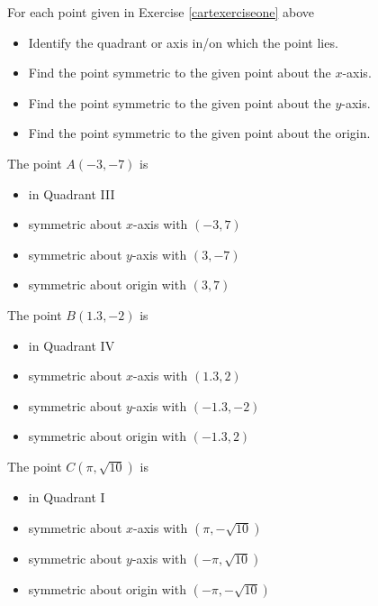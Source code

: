 {For each point given in Exercise \ref{cartexerciseone} above

\begin{itemize}

\item Identify the quadrant or axis in/on which the point lies.
\item Find the point symmetric to the given point about the $x$-axis.
\item Find the point symmetric to the given point about the $y$-axis.
\item Find the point symmetric to the given point about the origin.

\end{itemize}}
{The point $A(-3, -7)$ is 

\begin{itemize}

\item in Quadrant III
\item symmetric about $x$-axis with $(-3, 7)$
\item symmetric about $y$-axis with $(3, -7)$
\item symmetric about origin with $(3, 7)$

\end{itemize}

The point $B(1.3, -2)$ is 

\begin{itemize}

\item in Quadrant IV
\item symmetric about $x$-axis with $(1.3, 2)$
\item symmetric about $y$-axis with $(-1.3, -2)$
\item symmetric about origin with $(-1.3, 2)$

\end{itemize}

The point $C(\pi, \sqrt{10})$ is 

\begin{itemize}

\item in Quadrant I
\item symmetric about $x$-axis with {\small $(\pi, -\sqrt{10})$}
\item symmetric about $y$-axis with {\small $(-\pi, \sqrt{10})$}
\item symmetric about origin with {\scriptsize $(-\pi, -\sqrt{10})$}

\end{itemize}

}

